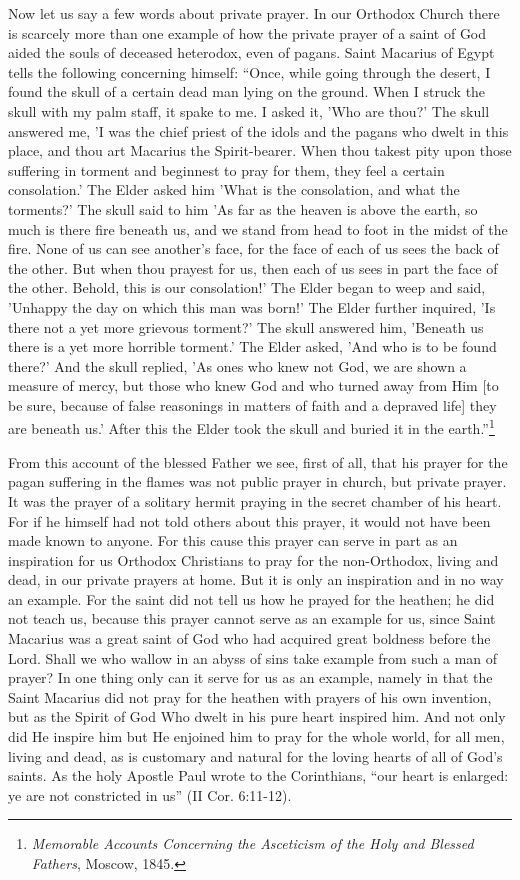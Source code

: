 Now let us say a few words about private prayer. In our Orthodox Church there is scarcely more than one example of how the private prayer of a saint of God aided the souls of deceased heterodox, even of pagans. Saint Macarius of Egypt tells the following concerning himself: ``Once, while going through the desert, I found the skull of a certain dead man lying on the ground. When I struck the skull with my palm staff, it spake to me. I asked it, 'Who are thou?' The skull answered me, 'I was the chief priest of the idols and the pagans who dwelt in this place, and thou art Macarius the Spirit-bearer. When thou takest pity upon those suffering in torment and beginnest to pray for them, they feel a certain consolation.' The Elder asked him 'What is the consolation, and what the torments?' The skull said to him 'As far as the heaven is above the earth, so much is there fire beneath us, and we stand from head to foot in the midst of the fire. None of us can see another's face, for the face of each of us sees the back of the other. But when thou prayest for us, then each of us sees in part the face of the other. Behold, this is our consolation!' The Elder began to weep and said, 'Unhappy the day on which this man was born!' The Elder further inquired, 'Is there not a yet more grievous torment?' The skull answered him, 'Beneath us there is a yet more horrible torment.' The Elder asked, 'And who is to be found there?' And the skull replied, 'As ones who knew not God, we are shown a measure of mercy, but those who knew God and who turned away from Him [to be sure, because of false reasonings in matters of faith and a depraved life] they are beneath us.' After this the Elder took the skull and buried it in the earth.''\footnote{\textit{Memorable Accounts Concerning the Asceticism of the Holy and Blessed Fathers}, Moscow, 1845.}

From this account of the blessed Father we see, first of all, that his prayer for the pagan suffering in the flames was not public prayer in church, but private prayer. It was the prayer of a solitary hermit praying in the secret chamber of his heart. For if he himself had not told others about this prayer, it would not have been made known to anyone. For this cause this prayer can serve in part as an inspiration for us Orthodox Christians to pray for the non-Orthodox, living and dead, in our private prayers at home. But it is only an inspiration and in no way an example. For the saint did not tell us how he prayed for the heathen; he did not teach us, because this prayer cannot serve as an example for us, since Saint Macarius was a great saint of God who had acquired great boldness before the Lord. Shall we who wallow in an abyss of sins take example from such a man of prayer? In one thing only can it serve for us as an example, namely in that the Saint Macarius did not pray for the heathen with prayers of his own invention, but as the Spirit of God Who dwelt in his pure heart inspired him. And not only did He inspire him but He enjoined him to pray for the whole world, for all men, living and dead, as is customary and natural for the loving hearts of all of God's saints. As the holy Apostle Paul wrote to the Corinthians, ``our heart is enlarged: ye are not constricted in us'' (II Cor. 6:11-12).

